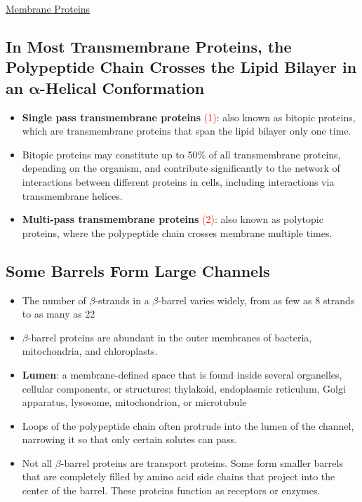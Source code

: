 \documentclass[12pt,letterpaper]{article}
\begin{document}
\begin{secbox}{\hyperlink{10}{Membrane Proteins}}
{    \hypertarget{10.9}{\subsection*{In Most Transmembrane Proteins, the Polypeptide Chain Crosses the Lipid Bilayer in an \(\bm{\alpha}\)-Helical Conformation}}
    \begin{itemize}
        \item \textbf{Single pass transmembrane proteins} \textcolor{red}{(1)}: also known as bitopic proteins, which are transmembrane proteins that span the lipid bilayer only one time. 
        \item Bitopic proteins may constitute up to 50\% of all transmembrane proteins, depending on the organism, and contribute significantly to the network of interactions between different proteins in cells, including interactions via transmembrane helices.
        \item \textbf{Multi-pass transmembrane proteins} \textcolor{red}{(2)}: also known as polytopic proteins, where the polypeptide chain crosses membrane multiple times. 
    \end{itemize}

    \hypertarget{10.10}{\subsection*{Some \bfg{\beta} Barrels Form Large Channels}}
    \begin{itemize}
        \item The number of \(\beta\)-strands in a \(\beta\)-barrel varies widely, from as few as 8 strands to as many as 22
        \item \(\beta\)-barrel proteins are abundant in the outer membranes of bacteria, mitochondria, and chloroplasts.
        \item \textbf{Lumen}: a membrane-defined space that is found inside several organelles, cellular components, or structures: thylakoid, endoplasmic reticulum, Golgi apparatus, lysosome, mitochondrion, or microtubule
        \item Loops of the polypeptide chain often protrude into the lumen of the channel, narrowing it so that only certain solutes can pass.
        \item Not all \(\beta\)-barrel proteins are transport proteins. Some form smaller barrels that are completely filled by amino acid side chains that project into the center of the barrel. These proteins function as receptors or enzymes.
    \end{itemize}

}
\end{secbox}
\end{document}
